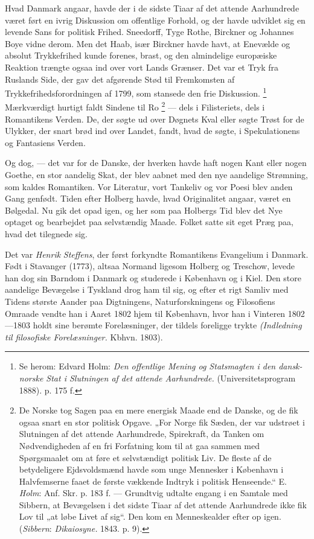 \documentclass[12pt,a4paper,openany]{book}
\newcommand{\opage}[1]{\marginnote{\footnotesize\textit{[#1]}}}
\begin{document}
Hvad Danmark angaar, havde der i de sidste Tiaar af det attende Aarhundrede
været ført en ivrig Diskussion om offentlige Forhold, og der havde udviklet sig
en levende Sans for politisk Frihed. Sneedorff, Tyge Rothe, Birckner og
Johannes Boye vidne derom. Men det Haab, især Birckner havde havt, at Enevælde
og absolut Trykkefrihed kunde forenes, brast, og den almindelige europæiske
Reaktion trængte ogsaa ind over vort Lands Grænser. Det var et Tryk fra
Ruslands Side, der gav det afgørende Stød til Fremkomsten af
Trykkefrihedsforordningen af 1799, som stansede den frie Diskussion.%
\footnote[1]{Se herom: Edvard Holm: \textit{Den offentlige Mening og
Statsmagten i den dansk-norske Stat i Slutningen af det attende Aarhundrede.}
(Universitetsprogram 1888). p. 175 f.} Mærkværdigt hurtigt faldt Sindene til Ro%
\footnote[2]{De Norske tog Sagen paa en mere energisk Maade end de Danske, og
de fik ogsaa snart en stor politisk Opgave. „For Norge fik Sæden, der var
udstrøet i Slutningen af det attende Aarhundrede, Spirekraft, da Tanken om
Nødvendigheden af en fri Forfatning kom til at gaa sammen med Spørgsmaalet om
at føre et selvstændigt politisk Liv. De fleste af de betydeligere
Ejdsvoldsmænd havde som unge Mennesker i København i Halvfemserne faaet de
første vækkende Indtryk i politisk Henseende.“ E. \emph{Holm}: Anf. Skr. p. 183
f. --- Grundtvig udtalte engang i en Samtale med Sibbern, at Bevægelsen i det
sidste Tiaar af det attende Aarhundrede ikke fik Lov til „at løbe Livet af
sig“. Den kom en Menneskealder efter op igen. (\emph{Sibbern}:
\textit{Dikaiosyne.} 1843. p. 9).} --- dels i Filisteriets, dels i Romantikens
Verden. De, der søgte ud over Døgnets Kval eller søgte Trøst for de Ulykker,
der snart brød ind over Landet, fandt, hvad de søgte, i Spekulationens og
Fantasiens Verden.

Og dog, --- det var for de Danske, der hverken havde haft nogen Kant eller
nogen Goethe, en stor aandelig Skat, der blev aabnet med den nye aandelige
Strømning, som kaldes Romantiken. Vor Literatur, vort Tankeliv og vor Poesi blev
\setcounter{footnote}{0}%
\opage{42}anden Gang genfødt. Tiden efter Holberg havde, hvad Originalitet
angaar, været en Bølgedal. Nu gik det opad igen, og her som paa Holbergs Tid
blev det Nye optaget og bearbejdet paa selvstændig Maade. Folket satte sit eget
Præg paa, hvad det tilegnede sig.

Det var \emph{Henrik} \emph{Steffens}, der først forkyndte Romantikens
Evangelium i Danmark. Født i Stavanger (1773), altsaa Normand ligesom Holberg
og Treschow, levede han dog sin Barndom i Danmark og studerede i København og i
Kiel. Den store aandelige Bevægelse i Tyskland drog ham til sig, og efter et
rigt Samliv med Tidens største Aander paa Digtningens, Naturforskningens og
Filosofiens Omraade vendte han i Aaret 1802 hjem til København, hvor han i
Vinteren 1802---1803 holdt sine berømte Forelæsninger, der tildels foreligge
trykte \textit{(Indledning til filosofiske Forelæsninger.} Kbhvn. 1803).
\end{document}

